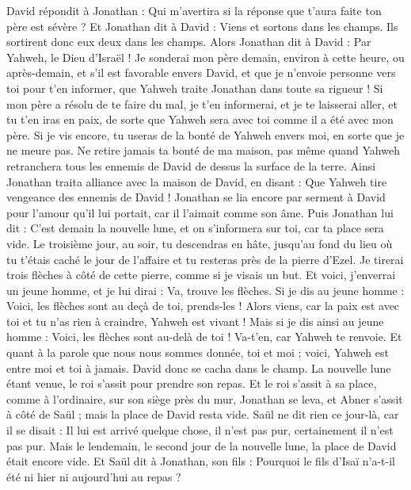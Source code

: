 \begin{multicols}{2}
David répondit à Jonathan : Qui m’avertira si la réponse que t'aura faite ton père est sévère ?
Et Jonathan dit à David : Viens et sortons dans les champs. Ils sortirent donc eux deux dans les champs.
Alors Jonathan dit à David : Par Yahweh, le Dieu d'Israël ! Je sonderai mon père demain, environ à cette heure, ou après-demain, et s’il est favorable envers David, et que je n'envoie personne vers toi pour t’en informer,
que Yahweh traite Jonathan dans toute sa rigueur ! Si mon père a résolu de te faire du mal, je t’en informerai, et je te laisserai aller, et tu t'en iras en paix, de sorte que Yahweh sera avec toi comme il a été avec mon père.
Si je vis encore, tu useras de la bonté de Yahweh envers moi, en sorte que je ne meure pas.
Ne retire jamais ta bonté de ma maison, pas même quand Yahweh retranchera tous les ennemis de David de dessus la surface de la terre.
Ainsi Jonathan traita alliance avec la maison de David, en disant : Que Yahweh tire vengeance des ennemis de David !
Jonathan se lia encore par serment à David pour l'amour qu'il lui portait, car il l'aimait comme son âme.
Puis Jonathan lui dit : C'est demain la nouvelle lune, et on s'informera sur toi, car ta place sera vide.
Le troisième jour, au soir, tu descendras en hâte, jusqu’au fond du lieu où tu t’étais caché le jour de l’affaire et tu resteras près de la pierre d'Ezel.
Je tirerai trois flèches à côté de cette pierre, comme si je visais un but.
Et voici, j'enverrai un jeune homme, et je lui dirai : Va, trouve les flèches. Si je dis au jeune homme : Voici, les flèches sont au deçà de toi, prends-les ! Alors viens, car la paix est avec toi et tu n’as rien à craindre, Yahweh est vivant !
Mais si je dis ainsi au jeune homme : Voici, les flèches sont au-delà de toi ! Va-t'en, car Yahweh te renvoie.
Et quant à la parole que nous nous sommes donnée, toi et moi ; voici, Yahweh est entre moi et toi à jamais.
David donc se cacha dans le champ. La nouvelle lune étant venue, le roi s'assit pour prendre son repas.
Et le roi s’assit à sa place, comme à l’ordinaire, sur son siège près du mur, Jonathan se leva, et Abner s'assit à côté de Saül ; mais la place de David resta vide.
Saül ne dit rien ce jour-là, car il se disait : Il lui est arrivé quelque chose, il n'est pas pur, certainement il n'est pas pur.
Mais le lendemain, le second jour de la nouvelle lune, la place de David était encore vide. Et Saül dit à Jonathan, son fils : Pourquoi le fils d'Isaï n'a-t-il été ni hier ni aujourd'hui au repas ?

\end{multicols}
